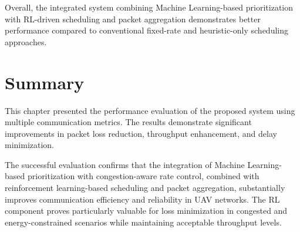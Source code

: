 Overall, the integrated system combining 
Machine Learning-based prioritization with RL-driven 
scheduling and packet aggregation demonstrates 
better performance compared to conventional 
fixed-rate and heuristic-only scheduling approaches.



\section{Summary}

This chapter presented the performance 
evaluation of the proposed system using 
multiple communication metrics. The results 
demonstrate significant improvements in 
packet loss reduction, throughput enhancement, 
and delay minimization.

The successful evaluation confirms that 
the integration of Machine Learning-based 
prioritization with congestion-aware rate 
control, combined with reinforcement learning-based 
scheduling and packet aggregation, substantially 
improves communication efficiency and reliability 
in UAV networks. The RL component proves particularly 
valuable for loss minimization in congested and 
energy-constrained scenarios while maintaining 
acceptable throughput levels.